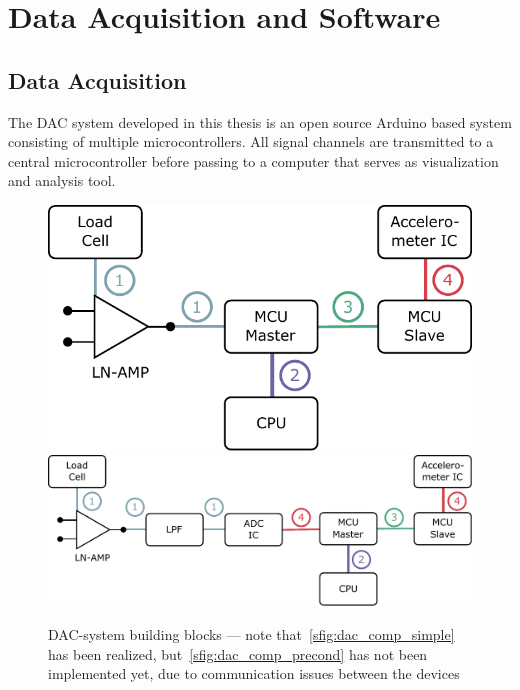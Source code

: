 \chapter{Data Acquisition and Software%
  \label{chap:\currfilebase}}

\section{Data Acquisition}

The \ac{DAC} system developed in this thesis is an open source Arduino based system consisting of multiple microcontrollers. All signal channels are transmitted to a central microcontroller before passing to a computer that serves as visualization and analysis tool.

\begin{figure}[!htb]
  \centering
    {\includegraphics[scale=0.5]{figures/dac/dac_components/dac_comp_simple}}
    \hfill
    {\includegraphics[scale=0.5]{figures/dac/dac_components/dac_comp_precond}}
  \\[0.5em]
  \caption[DAC Building Blocks]{\acs{DAC}-system building blocks --- note that~\ref{sfig:dac_comp_simple} has been realized, but~\ref{sfig:dac_comp_precond} has not been implemented yet, due to communication issues between the devices%
    \label{fig:dac_building_blocks}}
\end{figure}

